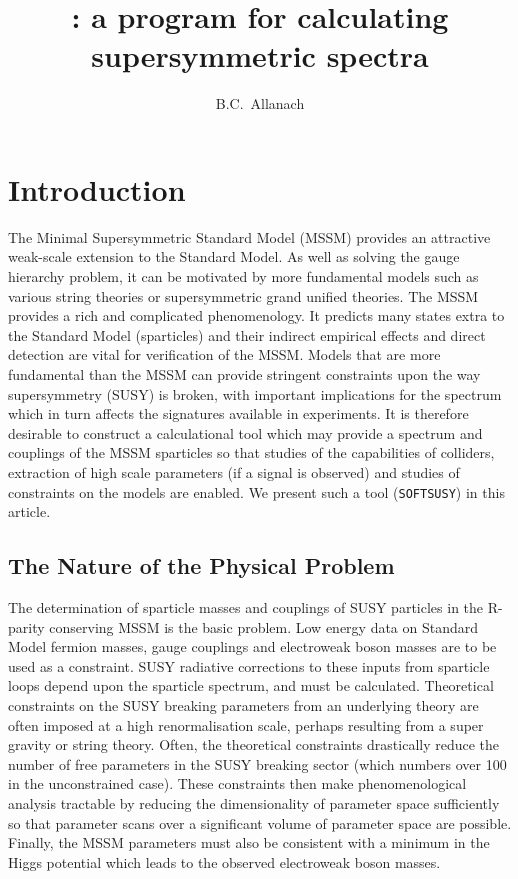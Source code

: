 \documentclass{article}
\title{{\SOFTSUSY}: a program for calculating supersymmetric spectra}
\author[a]{B.C.~Allanach}
\affiliation[a]{DAMTP, CMS, University of Cambridge, Wilberforce road, Cambridge, CB3 0WA,
United Kingdom}
\def\SOFTSUSY{{\tt SOFTSUSY}}
\begin{document}
\maketitle
\section{Introduction}

The Minimal Supersymmetric Standard Model (MSSM) provides an attractive
weak-scale extension to the Standard Model. As well as solving the gauge
hierarchy problem, it can be motivated by more fundamental models such as 
various string theories or supersymmetric grand unified theories. 
The MSSM provides a rich and complicated
phenomenology. It predicts many states  extra to
the Standard Model (sparticles) and
their indirect empirical 
effects and direct detection are vital for
verification of the MSSM\@.
Models that are more fundamental than
the MSSM can provide stringent constraints upon
the way supersymmetry (SUSY) is broken, with important implications for the
spectrum which in turn affects the signatures available in experiments.
It is therefore desirable to construct a calculational tool which may 
provide a spectrum and couplings of the MSSM sparticles so that studies 
of the capabilities of colliders, extraction of 
high scale parameters (if a signal is observed) and studies of constraints on
the models are enabled. We present such a tool (\SOFTSUSY) in this article.

\subsection{The Nature of the Physical Problem}

The determination of sparticle masses and couplings of SUSY particles in the
R-parity conserving MSSM is the basic problem. Low energy data on Standard
Model fermion masses,
gauge couplings and electroweak boson masses are to be used as  a constraint.
SUSY radiative corrections to these inputs from sparticle loops depend upon
the sparticle spectrum, and must be calculated.
Theoretical constraints on the SUSY breaking parameters from an underlying
theory
are often imposed at a high renormalisation scale, perhaps resulting from a
super gravity or string theory. Often, the theoretical constraints drastically
reduce the number of free parameters in the SUSY breaking sector (which
numbers over 100 in the unconstrained case). These constraints then make
phenomenological analysis tractable by reducing the dimensionality of
parameter space sufficiently so that parameter scans over a significant volume
of parameter space are possible. Finally, the MSSM parameters must also be
consistent with a minimum in the Higgs potential which leads to the observed
electroweak boson masses.
\end{document}
